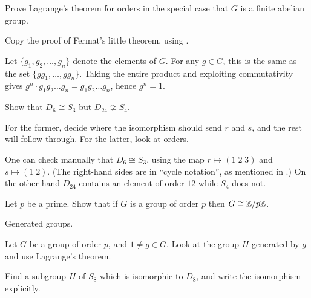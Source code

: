 \begin{problem}
	Prove Lagrange's theorem for orders in the special case
	that $G$ is a finite abelian group.
	\begin{hint}
		Copy the proof of Fermat's little theorem, using
		.
	\end{hint}
	\begin{sol}
		Let $\{g_1, g_2, \dots, g_n\}$ denote the elements of $G$.
		For any $g \in G$, this is the same as the set $\{gg_1, \dots, gg_n\}$.
		Taking the entire product and exploiting commutativity gives
		$g^n \cdot g_1g_2 \dots g_n = g_1g_2 \dots g_n$, hence $g^n=1$.
	\end{sol}
\end{problem}

\begin{problem}
	Show that $D_6 \cong S_3$ but $D_{24} \not\cong S_4$.
	\begin{hint}
		For the former,
		decide where the isomorphism should send $r$ and $s$,
		and the rest will follow through.
		For the latter, look at orders.
	\end{hint}
	\begin{sol}
		One can check manually that $D_6 \cong S_3$,
		using the map $r \mapsto (1 \; 2 \; 3)$ and $s \mapsto (1 \; 2)$.
		(The right-hand sides are in ``cycle notation'',
		as mentioned in \Cref{subsec:cycle_notation}.)
		On the other hand $D_{24}$ contains an element of order $12$
		while $S_4$ does not.
	\end{sol}
\end{problem}

\begin{sproblem}
	Let $p$ be a prime.
	Show that if $G$ is a group of order $p$ then $G \cong \mathbb Z/p\mathbb Z$.
	\begin{hint}
		Generated groups.
	\end{hint}
	\begin{sol}
		Let $G$ be a group of order $p$, and $1 \neq g \in G$.
		Look at the group $H$ generated by $g$ and use Lagrange's theorem.
	\end{sol}
\end{sproblem}

\begin{problem}
	Find a subgroup $H$ of $S_8$
	which is isomorphic to $D_8$,
	and write the isomorphism explicitly.
\end{problem}

